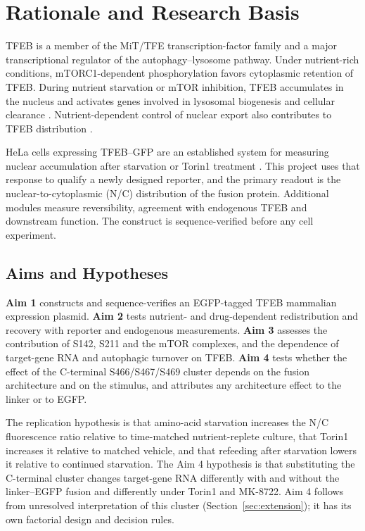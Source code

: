 \section{Rationale and Research Basis}
TFEB is a member of the MiT/TFE transcription-factor family and a major transcriptional regulator of the autophagy--lysosome pathway. Under nutrient-rich conditions, mTORC1-dependent phosphorylation favors cytoplasmic retention of TFEB. During nutrient starvation or mTOR inhibition, TFEB accumulates in the nucleus and activates genes involved in lysosomal biogenesis and cellular clearance \cite{Settembre2012,RoczniakFerguson2012}. Nutrient-dependent control of nuclear export also contributes to TFEB distribution \cite{Napolitano2018}.

HeLa cells expressing TFEB--GFP are an established system for measuring nuclear accumulation after starvation or Torin1 treatment \cite{RoczniakFerguson2012}. This project uses that response to qualify a newly designed reporter, and the primary readout is the nuclear-to-cytoplasmic (N/C) distribution of the fusion protein. Additional modules measure reversibility, agreement with endogenous TFEB and downstream function. The construct is sequence-verified before any cell experiment.

\subsection{Aims and Hypotheses}
\textbf{Aim 1} constructs and sequence-verifies an EGFP-tagged TFEB mammalian expression plasmid. \textbf{Aim 2} tests nutrient- and drug-dependent redistribution and recovery with reporter and endogenous measurements. \textbf{Aim 3} assesses the contribution of S142, S211 and the mTOR complexes, and the dependence of target-gene RNA and autophagic turnover on TFEB. \textbf{Aim 4} tests whether the effect of the C-terminal S466/S467/S469 cluster depends on the fusion architecture and on the stimulus, and attributes any architecture effect to the linker or to EGFP.

The replication hypothesis is that amino-acid starvation increases the N/C fluorescence ratio relative to time-matched nutrient-replete culture, that Torin1 increases it relative to matched vehicle, and that refeeding after starvation lowers it relative to continued starvation. The Aim 4 hypothesis is that substituting the C-terminal cluster changes target-gene RNA differently with and without the linker--EGFP fusion and differently under Torin1 and MK-8722. Aim 4 follows from unresolved interpretation of this cluster (Section~\ref{sec:extension}); it has its own factorial design and decision rules.
